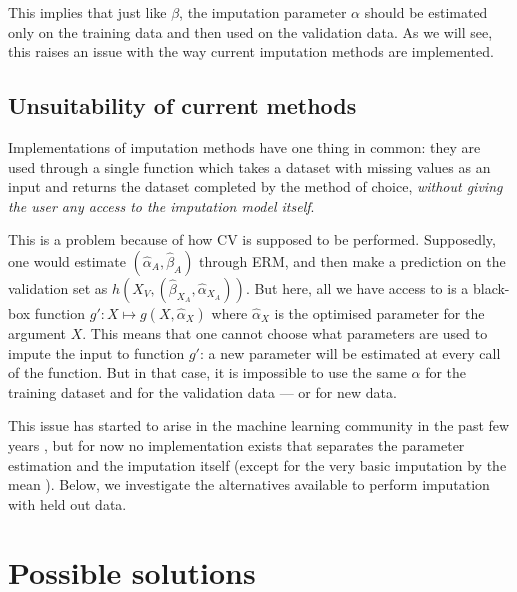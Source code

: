 This implies that just like $\beta$, the imputation parameter $\alpha$ should be estimated only on the training data and then used on the validation data. As we will see, this raises an issue with the way current imputation methods are implemented.

		\subsection{Unsuitability of current methods}
Implementations of imputation methods have one thing in common: they are used through a single function which takes a dataset with missing values as an input and returns the dataset completed by the method of choice, \emph{without giving the user any access to the imputation model itself}. \cite{method1} \cite{method2}\cite{...}

This is a problem because of how CV is supposed to be performed. Supposedly, one would estimate $(\hat{\alpha}_A, \hat{\beta}_A)$ through ERM, and then make a prediction on the validation set as $h(X_V,(\hat{\beta}_{X_A},\hat{\alpha}_{X_A}))$. But here, all we have access to is a black-box function $g': X \mapsto g(X, \hat{\alpha}_X)$ where $\hat{\alpha}_X$ is the optimised parameter for the argument $X$. This means that one cannot choose what parameters are used to impute the input to function $g'$: a new parameter will be estimated at every call of the function. But in that case, it is impossible to use the same $\alpha$ for the training dataset and for the validation data --- or for new data.
	
This issue has started to arise in the machine learning community in the past few years \cite{thread_newdata1}\cite{thread_newdata2}\cite{thread_newdata3}, but for now no implementation exists that separates the parameter estimation and the imputation itself (except for the very basic imputation by the mean \cite{mean_iputation}). Below, we investigate the alternatives available to perform imputation with held out data.

	\section{Possible solutions}
	\label{ERM.solutions}
	
